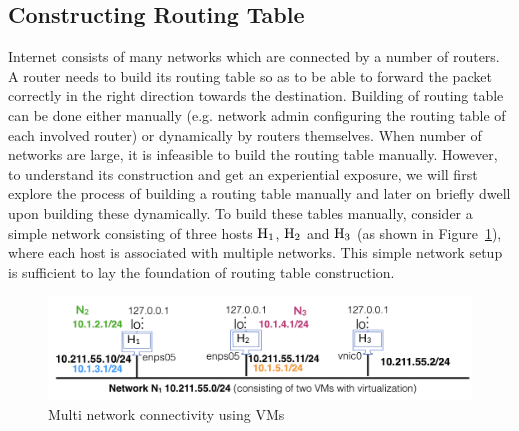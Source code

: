 \begin{multicols}{2}
\section{Constructing Routing Table}\label{chap2-sec4}

Internet consists of many networks which are connected by a number of routers. A router needs to build its routing table so as to be able to forward the packet correctly in the right direction towards the destination. Building of routing table can be done either manually (e.g. network admin configuring the routing table of each involved router) or dynamically by routers themselves. When number of networks are large, it is infeasible to build the routing table manually. However, to understand its construction and get an experiential exposure, we will first explore the process of building a routing table manually and later on briefly dwell upon building these dynamically. To build these tables manually, consider a simple network consisting of three hosts ${\rm H}_{1}$, ${\rm H}_{2}$ and ${\rm H}_{3}$ (as shown in Figure~\ref{chap2-fig02}), where each host is associated with multiple networks. This simple network setup is sufficient to lay the foundation of routing table construction.
\end{multicols}

\begin{figure}[H]
\centering
\includegraphics[scale=1.4]{src/Figures/chap2/chap2-fig02.jpg}
\caption{Multi network connectivity using VMs}\label{chap2-fig02}
\end{figure}

